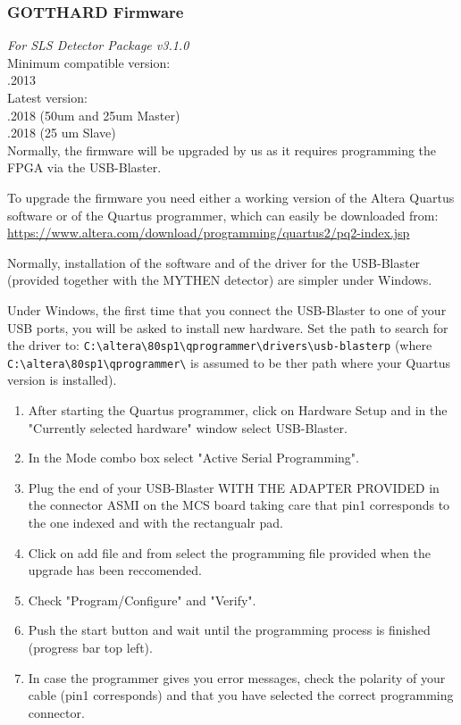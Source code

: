 \documentclass{article}
\begin{document}
\subsubsection{GOTTHARD Firmware}
\textit{For SLS Detector Package v3.1.0} \\
\indent Minimum compatible version: \\
\indent {}.2013 \\
\indent Latest version:	\\
\indent {}.2018 (50um and 25um Master) \\
\indent {}.2018 (25 um Slave) \\


Normally, the firmware will be upgraded by us as it requires programming the
FPGA via the USB-Blaster.


To upgrade the firmware you need either a working version of the Altera
Quartus software or of the Quartus programmer, which can easily be downloaded
from: \\
\url{https://www.altera.com/download/programming/quartus2/pq2-index.jsp}


Normally, installation of the software and of the driver for the
USB-Blaster (provided together with the MYTHEN detector) are simpler under
Windows.


Under Windows, the first time that you connect the USB-Blaster to one
of your USB ports, you will be asked to install new hardware. Set the path to
search for the driver to:
\verb=C:\altera\80sp1\qprogrammer\drivers\usb-blasterp= (where 
\verb=C:\altera\80sp1\qprogrammer\= is assumed to be ther path where your
Quartus version is installed).
\begin{enumerate}
\item After starting the Quartus programmer, click on Hardware Setup and in the
"Currently selected hardware" window select USB-Blaster.
\item In the Mode combo box select "Active Serial Programming".
\item Plug the end of your USB-Blaster WITH THE ADAPTER PROVIDED in the
connector ASMI on the MCS board taking care that pin1 corresponds to the one
indexed and with the rectangualr pad.
\item Click on add file and from select the programming file provided when
the upgrade has been reccomended.
\item Check "Program/Configure" and "Verify".
\item Push the start button and wait until the programming process is
finished (progress bar top left).
\item In case the programmer gives you error messages, check the polarity of
your cable (pin1 corresponds) and that you have selected the correct programming
connector.
\end{enumerate}
\end{document}
